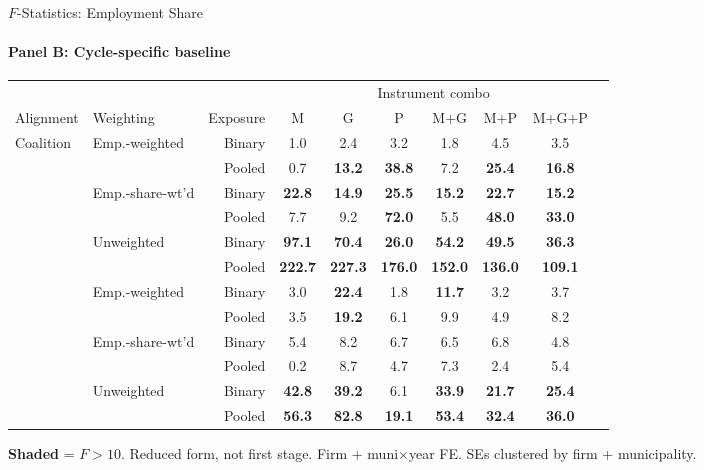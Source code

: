 \documentclass[aspectratio=169,10pt]{beamer}
\newcommand{\fpass}[1]{\cellcolor{pass}\textbf{#1}}
\begin{document}
\begin{frame}[t]{$F$-Statistics: Employment Share}
\framesubtitle{Panel B: Cycle-specific baseline}
\begin{center}
\footnotesize
\setlength{\tabcolsep}{3.5pt}
\renewcommand{\arraystretch}{1.05}
\begin{tabular}{@{}llrccccccc@{}}
\toprule
 & & & \multicolumn{6}{c}{Instrument combo} \\
\cmidrule(l{2pt}r{2pt}){4-9}
Alignment & Weighting & Exposure & M & G & P & M+G & M+P & M+G+P \\
\midrule
  \multirow{6}{*}{Coalition} & \multirow{2}{*}{Emp.-weighted} & Binary & 1.0 & 2.4 & 3.2 & 1.8 & 4.5 & 3.5 \\
   &  & Pooled & 0.7 & \fpass{13.2} & \fpass{38.8} & 7.2 & \fpass{25.4} & \fpass{16.8} \\
   & \multirow{2}{*}{Emp.-share-wt'd} & Binary & \fpass{22.8} & \fpass{14.9} & \fpass{25.5} & \fpass{15.2} & \fpass{22.7} & \fpass{15.2} \\
   &  & Pooled & 7.7 & 9.2 & \fpass{72.0} & 5.5 & \fpass{48.0} & \fpass{33.0} \\
   & \multirow{2}{*}{Unweighted} & Binary & \fpass{97.1} & \fpass{70.4} & \fpass{26.0} & \fpass{54.2} & \fpass{49.5} & \fpass{36.3} \\
   &  & Pooled & \fpass{222.7} & \fpass{227.3} & \fpass{176.0} & \fpass{152.0} & \fpass{136.0} & \fpass{109.1} \\
\addlinespace[5pt]
  \multirow{6}{*}{Party} & \multirow{2}{*}{Emp.-weighted} & Binary & 3.0 & \fpass{22.4} & 1.8 & \fpass{11.7} & 3.2 & 3.7 \\
   &  & Pooled & 3.5 & \fpass{19.2} & 6.1 & 9.9 & 4.9 & 8.2 \\
   & \multirow{2}{*}{Emp.-share-wt'd} & Binary & 5.4 & 8.2 & 6.7 & 6.5 & 6.8 & 4.8 \\
   &  & Pooled & 0.2 & 8.7 & 4.7 & 7.3 & 2.4 & 5.4 \\
   & \multirow{2}{*}{Unweighted} & Binary & \fpass{42.8} & \fpass{39.2} & 6.1 & \fpass{33.9} & \fpass{21.7} & \fpass{25.4} \\
   &  & Pooled & \fpass{56.3} & \fpass{82.8} & \fpass{19.1} & \fpass{53.4} & \fpass{32.4} & \fpass{36.0} \\
\bottomrule
\end{tabular}
\end{center}
{\scriptsize \colorbox{pass}{\textbf{Shaded}} = $F>10$. \textcolor{alertred}{Reduced form, not first stage.} Firm + muni$\times$year FE. SEs clustered by firm + municipality.}
\end{frame}
\end{document}
